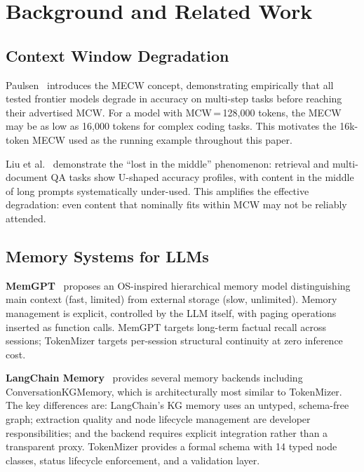 \documentclass[journal]{IEEEtran}
\begin{document}
\section{Background and Related Work}
\label{sec:related}

\subsection{Context Window Degradation}

Paulsen~\cite{paulsen2025} introduces the MECW concept,
demonstrating empirically that all tested frontier models
degrade in accuracy on multi-step tasks before reaching
their advertised MCW.
For a model with MCW\,=\,128{,}000 tokens, the MECW may be
as low as 16{,}000 tokens for complex coding tasks.
This motivates the 16k-token MECW used as the running example
throughout this paper.

Liu et al.~\cite{lostmiddle} demonstrate the ``lost in the
middle'' phenomenon: retrieval and multi-document QA tasks
show U-shaped accuracy profiles, with content in the middle
of long prompts systematically under-used.
This amplifies the effective degradation: even content that
nominally fits within MCW may not be reliably attended.

\subsection{Memory Systems for LLMs}

\textbf{MemGPT}~\cite{memgpt} proposes an OS-inspired
hierarchical memory model distinguishing main context (fast,
limited) from external storage (slow, unlimited).
Memory management is explicit, controlled by the LLM itself,
with paging operations inserted as function calls.
MemGPT targets long-term factual recall across sessions;
TokenMizer targets per-session structural continuity at
zero inference cost.

\textbf{LangChain Memory}~\cite{langchain} provides several
memory backends including ConversationKGMemory, which is
architecturally most similar to TokenMizer.
The key differences are: LangChain's KG memory uses an
untyped, schema-free graph; extraction quality and node
lifecycle management are developer responsibilities; and the
backend requires explicit integration rather than a
transparent proxy.
TokenMizer provides a formal schema with 14 typed node
classes, status lifecycle enforcement, and a validation layer.
\end{document}
